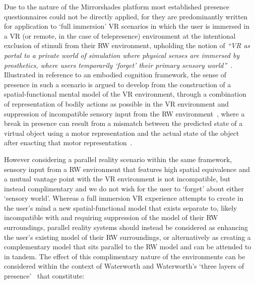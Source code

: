 Due to the nature of the Mirrorshades platform most established presence questionnaires could not be directly applied,  for they are predominantly written for application to `full immersion' VR scenarios in which the user is immersed in a VR (or remote, in the case of telepresence) environment at the intentional exclusion of stimuli from their RW environment, upholding the notion of \textit{``VR as portal to a private world of simulation where physical senses are immersed by prosthetics, where users temporarily `forget' their primary sensory world''}~\cite{Heim2014}. Illustrated in reference to an embodied cognition framework, the sense of presence in such a scenario is argued to develop from the construction of a spatial-functional mental model of the VR environment, through a combination of representation of bodily actions as possible in the VR environment and suppression of incompatible sensory input from the RW environment~\cite{Schubert2001}, where a break in presence can result from a mismatch between the predicted state of a virtual object using a motor representation and the actual state of the object after enacting that motor representation~\cite{Giuseppe2014}.

However considering a parallel reality scenario within the same framework, sensory input from a RW environment that features high spatial equivalence and a mutual vantage point with the VR environment is not incompatible, but instead complimentary and we do not wish for the user to `forget' about either `sensory world'. Whereas a full immersion VR experience attempts to create in the user's mind a new spatial-functional model that exists separate to, likely incompatible with and requiring suppression of the model of their RW surroundings, parallel reality systems should instead be considered as enhancing the user's existing model of their RW surroundings, or alternatively as creating a complementary model that sits parallel to the RW model and can be attended to in tandem. The effect of this complimentary nature of the environments can be considered within the context of Waterworth and Waterworth's `three layers of presence'~\cite{Mantovani2010, Giuseppe2014} that constitute:

